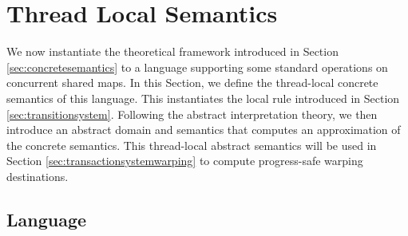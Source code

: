 \newcommand{\set}[1]{\mathsf{#1}}
\newcommand{\isSummary}{\set{isSummary}}
\newcommand{\freshNode}{\set{fresh}}
\newcommand{\heapnode}{\set{HeapNode}}
\newcommand{\reference}{\set{Ref}}
\newcommand{\variable}{\set{Var}}
\newcommand{\env}{\set{Env}}
\newcommand{\map}{\set{Map}}
\newcommand{\aset}[1]{\set{#1}^\#}
\newcommand{\state}{\set{\Sigma}}
\newcommand{\aenv}{\aset{Env}}
\newcommand{\amap}{\aset{Map}}
\newcommand{\astate}{\aset{\Sigma}}
\newcommand{\multistate}{\set{\Phi}}
\newcommand{\amultistate}{\aset{\multistate}}
\newcommand{\serializedCFGs}{\set{serializedCFGs}}
\newcommand{\isconcrete}{\set{single}}
\newcommand{\warpdestination}{\set{warpDest}}
\newcommand{\concretetransactions}{\set{TId}}
\newcommand{\abstracttransactions}{\aset{\concretetransactions}}

\section{Thread Local Semantics}
\label{se:instance}
We now instantiate the theoretical framework introduced in Section \ref{sec:concretesemantics} to a language supporting some standard operations on concurrent shared maps. In this Section, we define the thread-local concrete semantics of this language. This instantiates the {\sf local} rule introduced in Section \ref{sec:transitionsystem}. Following the abstract interpretation theory, we then introduce an abstract domain and semantics that computes an approximation of the concrete semantics. This thread-local abstract semantics will be used in Section \ref{sec:transactionsystemwarping} to compute progress-safe warping destinations.


\subsection{Language}
\label{sect:language}

